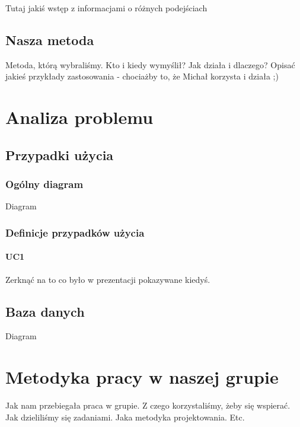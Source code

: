 \documentclass[pdflatex,11pt]{aghdpl}
\begin{document}
Tutaj jakiś wstęp z informacjami o różnych podejściach

\section{Nasza metoda}

Metoda, którą wybraliśmy. Kto i kiedy wymyślił? Jak działa i dlaczego? Opisać jakieś przykłady zastosowania - chociażby to, że Michał korzysta i działa ;)



\chapter{Analiza problemu}

\section{Przypadki użycia}

\subsection{Ogólny diagram}

Diagram

\subsection{Definicje przypadków użycia}

\subsubsection*{UC1}

Zerknąć na to co było w prezentacji pokazywane kiedyś.


\section{Baza danych}

Diagram



\chapter{Metodyka pracy w naszej grupie}

Jak nam przebiegała praca w grupie. Z czego korzystaliśmy, żeby się wspierać. Jak dzieliliśmy się zadaniami. Jaka metodyka projektowania. Etc.
\end{document}

